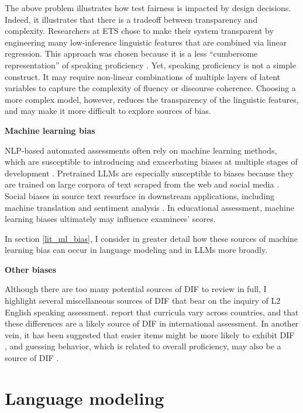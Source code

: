 \documentclass [PhD] {uclathes}
\begin{document}
The above problem illustrates how test fairness is impacted by design decisions. Indeed, it illustrates that there is a tradeoff between transparency and complexity. Researchers at ETS chose to make their system transparent by engineering many low-inference linguistic features that are combined via linear regression. This approach was chosen because it is a less “cumbersome representation” of speaking proficiency \citep[][p. 83]{loukina2019scoring}. Yet, speaking proficiency is not a simple construct. It may require non-linear combinations of multiple layers of latent variables to capture the complexity of fluency or discourse coherence. Choosing a more complex model, however, reduces the transparency of the linguistic features, and may make it more difficult to explore sources of bias.

\noindent \textbf{Machine learning bias} \;

NLP-based automated assessments often rely on machine learning methods, which are susceptible to introducing and exacerbating biases at multiple stages of development \citep{suresh2021framework}. Pretrained LLMs are especially susceptible to biases because they are trained on large corpora of text scraped from the web and social media \citep{blodgett2020}. Social biases in source text resurface in downstream applications, including machine translation \citep{stanovsky2019evaluating} and sentiment analysis \citep{kiritchenko2018examining}. In educational assessment, machine learning biases ultimately may influence examinees’ scores. 

In section \ref{lit_ml_bias}, I consider in greater detail how these sources of machine learning bias can occur in language modeling and in LLMs more broadly. 

\noindent \textbf{Other biases} \;

Although there are too many potential sources of DIF to review in full, I highlight several miscellaneous sources of DIF that bear on the inquiry of L2 English speaking assessment. \citet{huang2016exploring} report that curricula vary across countries, and that these differences are a likely source of DIF in international assessment. In another vein, it has been suggested that easier items might be more likely to exhibit DIF \citep{santelices2010unfair}, and guessing behavior, which is related to overall proficiency, may also be a source of DIF \citep{dorans2004examining}. 

\section{Language modeling}
\end{document}
